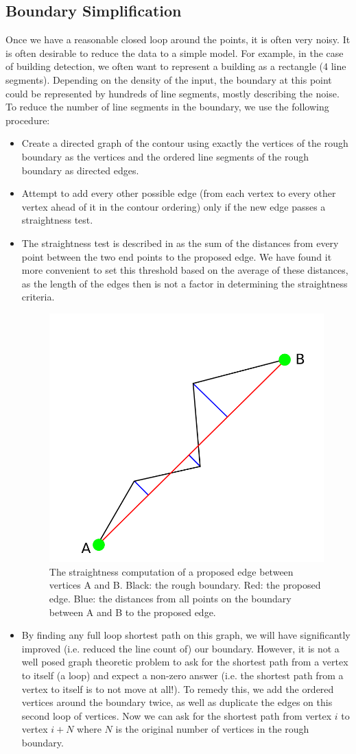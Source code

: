 \documentclass{InsightArticle}
\begin{document}
\subsection{Boundary Simplification}
Once we have a reasonable closed loop around the points, it is often very noisy. It is often desirable to reduce the data to a simple model. For example, in the case of building detection, we often want to represent a building as a rectangle (4 line segments). Depending on the density of the input, the boundary at this point could be represented by hundreds of line segments, mostly describing the noise. To reduce the number of line segments in the boundary, we use the following procedure:
\begin{itemize}
 \item Create a directed graph of the contour using exactly the vertices of the rough boundary as the vertices and the ordered line segments of the rough boundary as directed edges.
 \item Attempt to add every other possible edge (from each vertex to every other vertex ahead of it in the contour ordering) only if the new edge passes a straightness test.
 \item The straightness test is described in \cite{WangThesis} as the sum of the distances from every point between the two end points to the proposed edge. We have found it more convenient to set this threshold based on the average of these distances, as the length of the edges then is not a factor in determining the straightness criteria.
\begin{figure}[H]
  \centering
  \includegraphics[width=0.3\linewidth]{images/straightness}
  \caption{The straightness computation of a proposed edge between vertices A and B. Black: the rough boundary. Red: the proposed edge. Blue: the distances from all points on the boundary between A and B to the proposed edge.}
  \label{fig:Straightness}
\end{figure}
 \item By finding any full loop shortest path on this graph, we will have significantly improved (i.e. reduced the line count of) our boundary. However, it is not a well posed graph theoretic problem to ask for the shortest path from a vertex to itself (a loop) and expect a non-zero answer (i.e. the shortest path from a vertex to itself is to not move at all!). To remedy this, we add the ordered vertices around the boundary twice, as well as duplicate the edges on this second loop of vertices. Now we can ask for the shortest path from vertex $i$ to vertex $i+N$ where $N$ is the original number of vertices in the rough boundary.

\end{itemize}
\end{document}
